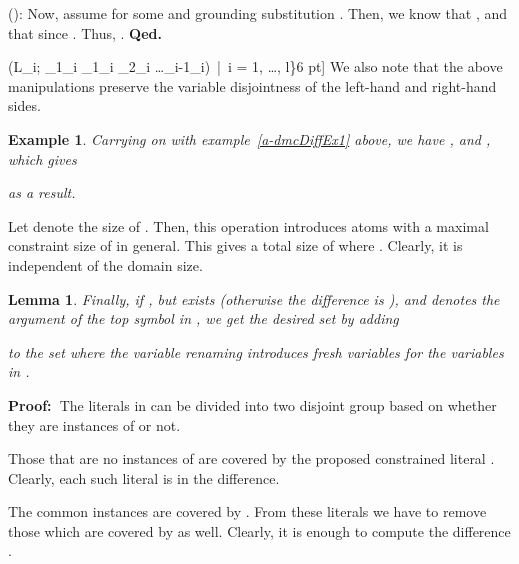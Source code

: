 \documentclass[a4paper]{article}
\newcommand{\startproof}{{\bf Proof:~}}
\newcommand{\finishproof}{{\bf Qed.}}
\newtheorem{example}[defi]{Example}
\newtheorem{lemm}[defi]{Lemma}
\begin{document}
(): Now, assume  
for some  and grounding substitution .
Then, we know that , and that  since .
Thus, .
\finishproof\\{ (L\sigma_i; \pi_1\sigma_i \land \eta_1\sigma_i \land \eta_2\sigma_i \land \dots \land \eta_{i-1}\sigma_i)~|~i = 1, \dots, l\}6 pt]
\indent
We also note that the above manipulations preserve the variable disjointness of the left-hand and right-hand sides.

\begin{example}
Carrying on with example~\ref{a-dmcDiffEx1} above, we have ,  and , which gives

as a result.
\end{example}

\indent
Let  denote the size of . 
Then, this operation introduces  atoms with a maximal constraint size of  in general. 
This gives a total size of  where .
Clearly, it is independent of the domain size.

\begin{lemm}
Finally, if , but  exists (otherwise the difference is ), and  denotes the argument of the top symbol in , we get the desired set by adding 

to the set  
where the variable renaming  introduces fresh variables for 
the variables in .
\end{lemm}

\startproof The literals in  can be divided into two disjoint group based on whether they are instances of  or not.

Those that are no instances of  are covered by the proposed constrained literal . Clearly, 
each such literal is in the difference.

The common instances are covered by . From these literals we have to remove those which are covered by  as well. 
Clearly, it is enough to compute the difference .

}
\end{document}
